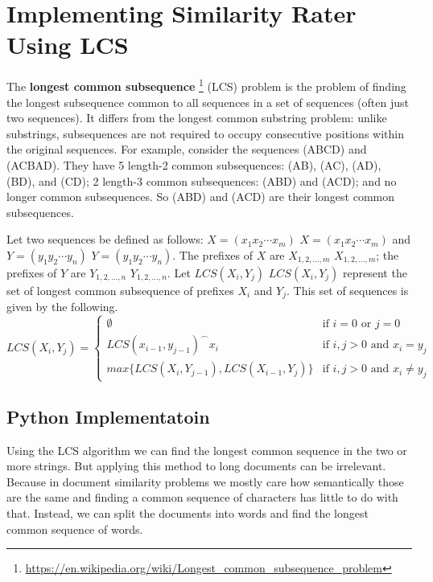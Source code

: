 \section{Implementing Similarity Rater Using LCS}
The \textbf{longest common subsequence}
\footnote{\href{https://en.wikipedia.org/wiki/Longest_common_subsequence_problem}
{https://en.wikipedia.org/wiki/Longest_common_subsequence_problem}} 
(LCS) problem is the 
problem of finding the longest subsequence common 
to all sequences in a set of sequences 
(often just two sequences). It differs 
from the longest common substring problem: 
unlike substrings, subsequences are not 
required to occupy consecutive positions within 
the original sequences.
For example, consider the sequences (ABCD) 
and (ACBAD). They have 5 length-2 common 
subsequences: (AB), (AC), (AD), (BD), and (CD); 
2 length-3 common subsequences: (ABD) and (ACD); 
and no longer common subsequences. So (ABD) and (ACD) 
are their longest common subsequences.


Let two sequences be defined as follows: 
$ X=(x_{1}x_{2}\cdots x_{m})$
$ X=(x_{1}x_{2}\cdots x_{m})$ and 
$ Y=(y_{1}y_{2}\cdots y_{n})$
$ Y=(y_{1}y_{2}\cdots y_{n})$.
The prefixes of $X$ are 
$X_{1,2,\dots ,m}$
$ X_{1,2,\dots ,m}$; the prefixes of 
$Y$ are $ Y_{1,2,\dots ,n}$
$ Y_{1,2,\dots ,n}$. Let 
$ {\mathit {LCS}}(X_{i},Y_{j})$
$ {\mathit {LCS}}(X_{i},Y_{j})$
represent the set of longest common subsequence of 
prefixes $ X_{i}$ and $ Y_{j}$. 
This set of sequences is given by the following.
\begin{equation}
\label{eq:lcs}
LCS(X_i,Y_j)=
\begin{cases}
\emptyset & \text{if } i=0 \text{ or } j =0\\
LCS(x_{i-1}, y_{j-1})^\frown x_i & \text{if } i,j>0 \text{ and } x_i = y_j\\
max\{LCS(X_i, Y_{j-1}), LCS(X_{i-1}, Y_j)\} & \text{if } i,j>0 \text{ and } x_i \neq y_j
\end{cases}
\end{equation}


\subsection{Python Implementatoin}
Using the LCS algorithm we can find the longest common 
sequence in the two or more strings. But applying this 
method to long documents can be irrelevant. Because in document 
similarity problems we mostly care how semantically those are the 
same and finding a common sequence of characters has little to do 
with that. Instead, we can split the documents into words and find the 
longest common sequence of words.

